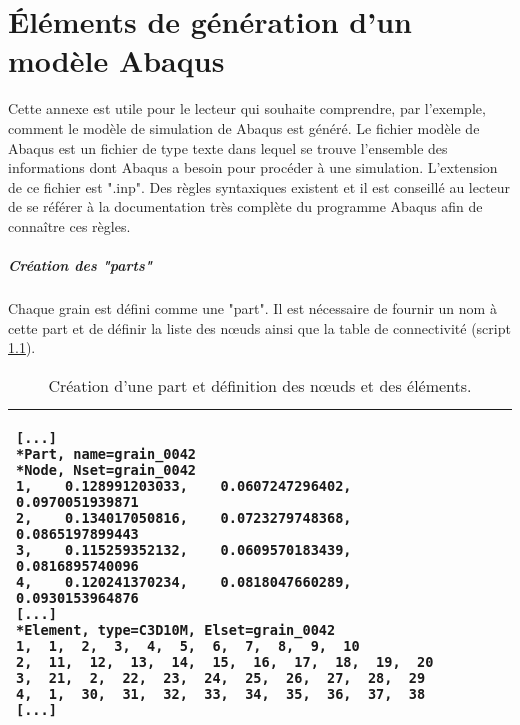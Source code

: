 \chapter{\'Eléments de génération d'un modèle Abaqus}
\label{annexe:modele_abaqus}
\captionsetup[table]{name=Script, position=bottom}

Cette annexe est utile pour le lecteur qui souhaite comprendre, par l'exemple, comment le modèle de simulation de Abaqus est généré. Le fichier modèle de Abaqus est un fichier de type texte dans lequel se trouve l'ensemble des informations dont Abaqus a besoin pour procéder à une simulation. L'extension de ce fichier est ".inp". Des règles syntaxiques existent et il est conseillé au lecteur de se référer à la documentation très complète du programme Abaqus \citep{abaqus2016} afin de connaître ces règles.

\paragraph{Création des "parts"\\}
Chaque grain est défini comme une "part". Il est nécessaire de fournir un nom à cette part et de définir la liste des n\oe{}uds ainsi que la table de connectivité (script \ref{script05:def_noeuds}).
\begin{table}[h]\centering
	\begin{tabular}{p{}}
		\hline
		\begin{lstlisting}[language={}, breaklines=true]
[...]
*Part, name=grain_0042
*Node, Nset=grain_0042
1,    0.128991203033,    0.0607247296402,    0.0970051939871
2,    0.134017050816,    0.0723279748368,    0.0865197899443
3,    0.115259352132,    0.0609570183439,    0.0816895740096
4,    0.120241370234,    0.0818047660289,    0.0930153964876
[...]
*Element, type=C3D10M, Elset=grain_0042
1,  1,  2,  3,  4,  5,  6,  7,  8,  9,  10
2,  11,  12,  13,  14,  15,  16,  17,  18,  19,  20
3,  21,  2,  22,  23,  24,  25,  26,  27,  28,  29
4,  1,  30,  31,  32,  33,  34,  35,  36,  37,  38
[...]
		\end{lstlisting}\\
		\hline
	\end{tabular}
	\caption{\label{script05:def_noeuds}Création d'une part et définition des n\oe{}uds et des éléments.}
\end{table}

